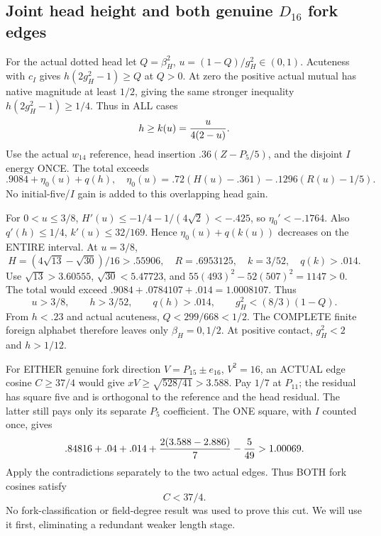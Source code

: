 \documentclass[11pt]{article}
\begin{document}
\subsection{Joint head height and both genuine \(D_{16}\) fork edges}
\label{app:arithD16Ijointforkcut}

For the actual dotted head let
\(Q=\beta_H^2\), \(u=(1-Q)/g_H^2\in(0,1)\).
Acuteness with \(c_I\) gives
\(h(2g_H^2-1)\ge Q\) at \(Q>0\).
At zero the positive actual mutual
has native magnitude at least \(1/2\),
giving the same stronger inequality
\(h(2g_H^2-1)\ge1/4\).
Thus in ALL cases
\[
                         h\ge k(u)={u\over4(2-u)} .
\]
Use the actual \(w_{14}\) reference,
head insertion \(.36(Z-P_5/5)\), and
the disjoint \(I\) energy ONCE.
The total exceeds
\[
 .9084+\eta_0(u)+q(h),\quad
 \eta_0(u)=.72(H(u)-.361)-.1296(R(u)-1/5).
\]
No initial-five/\(I\) gain is added
to this overlapping head gain.

For \(0<u\le3/8\),
\(H'(u)\le-1/4-1/(4\sqrt2)<-.425\),
so \(\eta_0'<-.1764\).
Also \(q'(h)\le1/4\),
\(k'(u)\le32/169\).
Hence \(\eta_0(u)+q(k(u))\) decreases
on the ENTIRE interval.
At \(u=3/8\),
\[
 H=(4\sqrt{13}-\sqrt{30})/16>.55906,\quad
 R=.6953125,\quad k=3/52,\quad q(k)>.014 .
\]
Use \(\sqrt{13}>3.60555\),
\(\sqrt{30}<5.47723\), and
\(55(493)^2-52(507)^2=1147>0\).
The total would exceed
\(.9084+.0784107+.014=1.0008107\).
Thus
\[
 u>3/8,\qquad h>3/52,\qquad q(h)>.014,\qquad
                              g_H^2<(8/3)(1-Q).
\tag{D16Iu}\label{eq:arithD16Ijointbounds}
\]
From \(h<.23\) and actual acuteness,
\(Q<299/668<1/2\).
The COMPLETE finite foreign alphabet
therefore leaves only
\(\beta_H=0,1/2\).
At positive contact,
\(g_H^2<2\) and \(h>1/12\).

For EITHER genuine fork direction
\(V=P_{15}\pm e_{16}\), \(V^2=16\),
an ACTUAL edge cosine \(C\ge37/4\)
would give
\(xV\ge\sqrt{528/41}>3.588\).
Pay \(1/7\) at \(P_{11}\); the residual
has square five and is orthogonal
to the reference and the head residual.
The latter still pays only its separate
\(P_5\) coefficient.
The ONE square, with \(I\) counted once,
gives
\[
                    .84816+.04+.014+
                         {2(3.588-2.886)\over7}-{5\over49}>1.00069 .
\]
Apply the contradictions separately to
the two actual edges.
Thus BOTH fork cosines satisfy
\[
                                      C<37/4 .
\tag{D16IC}\label{eq:arithD16Iforkcutoff}
\]
No fork-classification or field-degree
result was used to prove this cut.
We will use it first, eliminating a
redundant weaker length stage.
\end{document}

